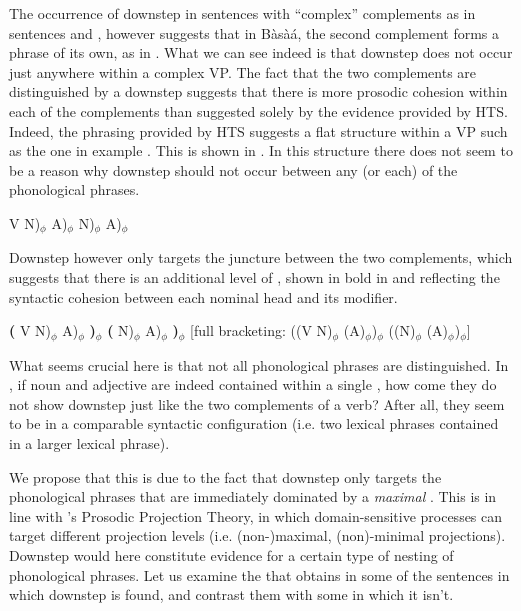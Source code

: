 \documentclass[output=paper,newtxmath,modfonts,nonflat,hidelinks]{langsci/langscibook}
\begin{document}
\noindent The occurrence of downstep in sentences with ``complex'' complements as in sentences  and , however suggests that in Bàsà{á}, the second complement forms a phrase of its own, as in . What we can see indeed is that downstep does not occur just anywhere within a complex VP. The fact that the two complements are distinguished by a downstep suggests that there is more prosodic cohesion within each of the complements than suggested solely by the evidence provided by HTS. Indeed, the phrasing provided by HTS suggests a flat structure within a VP such as the one in example . This is shown in . In this structure there does not seem to be a reason why downstep should not occur between any (or each) of the phonological phrases.


\ea V N)$_{\phi}$ A)$_{\phi}$ N)$_{\phi}$ A)$_{\phi}$ \label{ex:HamlaouiMakasso:25}
\z

\noindent Downstep however only targets the juncture between the two complements, which suggests that there is an additional level of , shown in bold in  and reflecting the syntactic cohesion between each nominal head and its modifier.


\ea \textbf{(} V N)$_{\phi}$ A)$_{\phi}$ \textbf{)$_{\phi}$} \textbf{(} N)$_{\phi}$ A)$_{\phi}$ \textbf{)$_{\phi}$} [full bracketing:  ((V N)$_{\phi}$ (A)$_{\phi}$)$_{\phi}$ ((N)$_{\phi}$ (A)$_{\phi}$)$_{\phi}$]\label{ex:HamlaouiMakasso:26}
\z

What seems crucial here is that not all phonological phrases are distinguished. In , if noun and adjective are indeed contained within a single , how come they do not show downstep just like the two complements of a verb? After all, they seem to be in a  comparable syntactic configuration (i.e. two lexical phrases contained in a larger lexical phrase).

We propose that this is due to the fact that downstep only targets the phonological phrases that are immediately dominated by a \emph{maximal} . This is in line with \citeauthor{ItoMester12}'s \citeyearpar{ItoMester12, ItoMester13} Prosodic Projection Theory, in which domain-sensitive processes can target different projection levels (i.e. (non-)maximal, (non)-minimal projections). Downstep would here constitute e\-vi\-dence for a certain type of nesting of phonological phrases.
Let us examine the  that obtains in some of the sentences in which downstep is found, and contrast them with some in which it isn't.  
\end{document}
